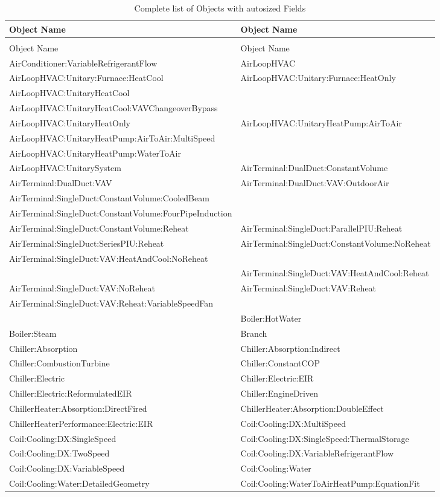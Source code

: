 \begin{longtable}[c]{p{3.3in}p{3.3in}}
\caption{Complete list of Objects with autosized Fields \label{table:complete-list-of-objects-with-autosized}} \tabularnewline
\toprule
Object Name & Object Name \tabularnewline
\midrule
\endfirsthead

\caption[]{Complete list of Objects with autosized Fields} \tabularnewline
\toprule
Object Name & Object Name \tabularnewline
\midrule
\endhead

AirConditioner:VariableRefrigerantFlow & AirLoopHVAC \tabularnewline
AirLoopHVAC:Unitary:Furnace:HeatCool & AirLoopHVAC:Unitary:Furnace:HeatOnly \tabularnewline
AirLoopHVAC:UnitaryHeatCool & \tabularnewline
AirLoopHVAC:UnitaryHeatCool:VAVChangeoverBypass & \tabularnewline
AirLoopHVAC:UnitaryHeatOnly & AirLoopHVAC:UnitaryHeatPump:AirToAir \tabularnewline
AirLoopHVAC:UnitaryHeatPump:AirToAir:MultiSpeed & \tabularnewline
AirLoopHVAC:UnitaryHeatPump:WaterToAir & \tabularnewline
AirLoopHVAC:UnitarySystem & AirTerminal:DualDuct:ConstantVolume \tabularnewline
AirTerminal:DualDuct:VAV & AirTerminal:DualDuct:VAV:OutdoorAir \tabularnewline
AirTerminal:SingleDuct:ConstantVolume:CooledBeam & \tabularnewline
AirTerminal:SingleDuct:ConstantVolume:FourPipeInduction & \tabularnewline
AirTerminal:SingleDuct:ConstantVolume:Reheat & AirTerminal:SingleDuct:ParallelPIU:Reheat \tabularnewline
AirTerminal:SingleDuct:SeriesPIU:Reheat & AirTerminal:SingleDuct:ConstantVolume:NoReheat \tabularnewline
AirTerminal:SingleDuct:VAV:HeatAndCool:NoReheat & \tabularnewline
 & AirTerminal:SingleDuct:VAV:HeatAndCool:Reheat \tabularnewline
AirTerminal:SingleDuct:VAV:NoReheat & AirTerminal:SingleDuct:VAV:Reheat \tabularnewline
AirTerminal:SingleDuct:VAV:Reheat:VariableSpeedFan & \tabularnewline
 & Boiler:HotWater \tabularnewline
Boiler:Steam & Branch \tabularnewline
Chiller:Absorption & Chiller:Absorption:Indirect \tabularnewline
Chiller:CombustionTurbine & Chiller:ConstantCOP \tabularnewline
Chiller:Electric & Chiller:Electric:EIR \tabularnewline
Chiller:Electric:ReformulatedEIR & Chiller:EngineDriven \tabularnewline
ChillerHeater:Absorption:DirectFired & ChillerHeater:Absorption:DoubleEffect \tabularnewline
ChillerHeaterPerformance:Electric:EIR & Coil:Cooling:DX:MultiSpeed \tabularnewline
Coil:Cooling:DX:SingleSpeed & Coil:Cooling:DX:SingleSpeed:ThermalStorage \tabularnewline
Coil:Cooling:DX:TwoSpeed & Coil:Cooling:DX:VariableRefrigerantFlow \tabularnewline
Coil:Cooling:DX:VariableSpeed & Coil:Cooling:Water \tabularnewline
Coil:Cooling:Water:DetailedGeometry & Coil:Cooling:WaterToAirHeatPump:EquationFit \tabularnewline

\end{longtable}
